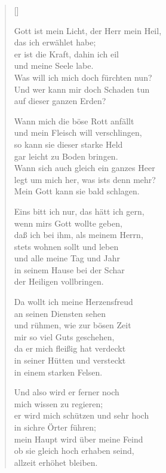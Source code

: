 \begin{multicols}{2}
\settowidth{\versewidth}{Gott ist mein Licht, der Herr mein Heil,}
\begin{verse}[\versewidth]

 Gott ist mein Licht, der Herr mein Heil,\\
das ich erwählet habe;\\
er ist die Kraft, dahin ich eil\\
und meine Seele labe.\\
Was will ich mich doch fürchten nun?\\
Und wer kann mir doch Schaden tun\\
auf dieser ganzen Erden?

 Wann mich die böse Rott anfällt\\
und mein Fleisch will verschlingen,\\
so kann sie dieser starke Held\\
gar leicht zu Boden bringen.\\
Wann sich auch gleich ein ganzes Heer\\
legt um mich her, was ists denn mehr?\\
Mein Gott kann sie bald schlagen.

 Eins bitt ich nur, das hätt ich gern,\\
wenn mirs Gott wollte geben,\\
daß ich bei ihm, als meinem Herrn,\\
stets wohnen sollt und leben\\
und alle meine Tag und Jahr\\
in seinem Hause bei der Schar\\
der Heiligen vollbringen.

 Da wollt ich meine Herzensfreud\\
an seinen Diensten sehen\\
und rühmen, wie zur bösen Zeit\\
mir so viel Guts geschehen,\\
da er mich fleißig hat verdeckt\\
in seiner Hütten und versteckt\\
in einem starken Felsen.

 Und also wird er ferner noch\\
mich wissen zu regieren;\\
er wird mich schützen und sehr hoch\\
in sichre Örter führen;\\
mein Haupt wird über meine Feind\\
ob sie gleich hoch erhaben seind,\\
allzeit erhöhet bleiben.


\end{verse}
\end{multicols}
